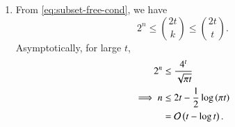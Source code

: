 \documentclass[journal,12pt,twocolumn]{IEEEtran}
\begin{document}
\begin{enumerate}
\begin{enumerate}
        \item From \eqref{eq:subset-free-cond}, we have
        \begin{equation}
            2^n \le \binom{2t}{k} \le \binom{2t}{t}.
            \label{eq:m-bound}
        \end{equation}
        Asymptotically, for large \(t\),
        \begin{align}
            2^n &\le \frac{4^t}{\sqrt{\pi t}} \\
            \implies n &\le 2t - \frac{1}{2}\log\left(\pi t\right) \\
            &= \mathcal{O}\left(t - \log{t}\right).
            \label{eq:n-asymptote}
        \end{align}
    \end{enumerate}
\end{enumerate}
\end{document}

